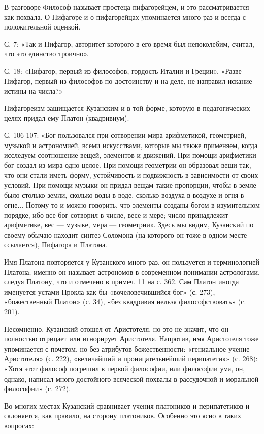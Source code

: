 В разговоре Философ называет простеца пифагорейцем, и это
рассматривается как похвала. О Пифагоре и о пифагорейцах упоминается
много раз и всегда с положительной оценкой.

С. 7: «Так и Пифагор, авторитет которого в его время был непоколебим,
считал, что это единство троично».

С. 18: «Пифагор, первый из философов, гордость Италии и Греции».
«Разве Пифагор, первый из философов по достоинству и на деле, не
направил искание истины на числа?»

Пифагореизм защищается Кузанским и в той форме, которую в
педагогических целях придал ему Платон (квадривиум).

С. 106-107: «Бог пользовался при сотворении мира арифметикой,
геометрией, музыкой и астрономией, всеми искусствами, которые мы также
применяем, когда исследуем соотношение вещей, элементов и движений.
При помощи арифметики бог создал из мира одно целое. При помощи
геометрии он образовал вещи так, что они стали иметь форму,
устойчивость и подвижность в зависимости от своих условий. При помощи
музыки он придал вещам такие пропорции, чтобы в земле было столько
земли, сколько воды в воде, сколько воздуха в воздухе и огня в огне...
Потому-то и можно говорить, что элементы созданы богом в изумительном
порядке, ибо все бог сотворил в числе, весе и мере; число принадлежит
арифметике, вес --- музыке, мера --- геометрии». Здесь мы видим,
Кузанский по своему обычаю находит синтез Соломона (на которого он
тоже в одном месте ссылается), Пифагора и Платона.

Имя Платона повторяется у Кузанского много раз, он пользуется и
терминологией Платона; именно он называет астрономов в современном
понимании астрологами, следуя Платону, что и отмечено в примеч. 11 на
с. 362. Сам Платон иногда именуется устами Прокла как бы
«вочеловечившийся бог» (с. 273), «божественный Платон» (с. 34), «без
квадривия нельзя философствовать» (с. 201).

Несомненно, Кузанский отошел от Аристотеля, но это не значит, что он
полностью отрицает или игнорирует Аристотеля. Напротив, имя Аристотеля
тоже упоминается с почетом, но без атрибутов божественности:
«гениальное учение Аристотеля» (с. 222), «величайший и
проницательнейший перипатетик» (с. 268): «Хотя этот философ погрешил в
первой философии, или философии ума, он, однако, написал много
достойного всяческой похвалы в рассудочной и моральной философии» (с.
272).

Во многих местах Кузанский сравнивает учения платоников и
перипатетиков и склоняется, как правило, на сторону платоников.
Особенно это ясно в таких вопросах:

